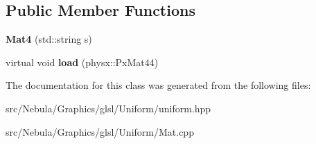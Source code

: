 \subsection*{\-Public \-Member \-Functions}
\begin{DoxyCompactItemize}
\item 
\hypertarget{classNeb_1_1glsl_1_1Uniform_1_1Scalar_1_1Mat4_ac57a935305d8c22176790fde979b5414}{{\bfseries \-Mat4} (std\-::string s)}\label{classNeb_1_1glsl_1_1Uniform_1_1Scalar_1_1Mat4_ac57a935305d8c22176790fde979b5414}

\item 
\hypertarget{classNeb_1_1glsl_1_1Uniform_1_1Scalar_1_1Mat4_ad58f9ce013be0a4a863fafd167a325e0}{virtual void {\bfseries load} (physx\-::\-Px\-Mat44)}\label{classNeb_1_1glsl_1_1Uniform_1_1Scalar_1_1Mat4_ad58f9ce013be0a4a863fafd167a325e0}

\end{DoxyCompactItemize}


\-The documentation for this class was generated from the following files\-:\begin{DoxyCompactItemize}
\item 
src/\-Nebula/\-Graphics/glsl/\-Uniform/uniform.\-hpp\item 
src/\-Nebula/\-Graphics/glsl/\-Uniform/\-Mat.\-cpp\end{DoxyCompactItemize}
